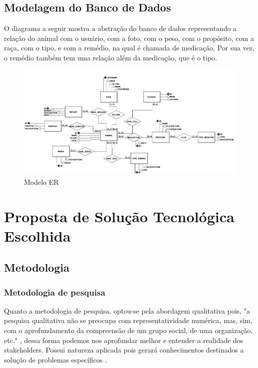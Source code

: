 \documentclass[12pt]{article}
\begin{document}
\newpage

\subsection{Modelagem do Banco de Dados}

O diagrama a seguir mostra a abstração do banco de dados representando a relação do animal com o usuário, com a foto, com o peso, com o propósito, com a raça, com o tipo, e com a remédio, na qual é chamada de medicação. Por sua vez, o remédio também tem uma relação além da medicação, que é o tipo.  

\begin{figure}[!h]
	\begin{center}
		\caption{Modelo ER}
		\includegraphics[width=6in]{img/erdoboi.jpeg}


	\end{center}
\end{figure}

\newpage

\section{Proposta de Solução Tecnológica Escolhida}

\subsection{Metodologia}

\subsubsection{Metodologia de pesquisa}

Quanto a metodologia de pesquisa, optou-se pela abordagem qualitativa pois, "a pesquisa qualitativa não se preocupa com representatividade numérica, mas, sim, com o aprofundamento da compreensão de um grupo social, de uma organização, etc." \cite{ufrgs09}, dessa forma podemos nos aprofundar melhor e entender a realidade dos stakeholders. Possui natureza aplicada pois gerará conhecimentos destinados a solução de problemas específicos \cite{ufrgs09} .
\end{document}
